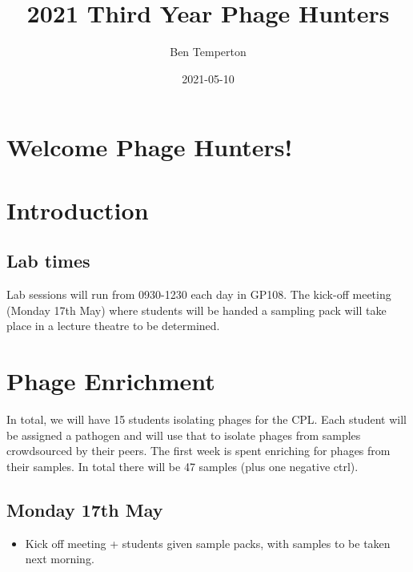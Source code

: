 \documentclass[
]{book}
\title{2021 Third Year Phage Hunters}
\author{Ben Temperton}
\date{2021-05-10}
\providecommand{\tightlist}{%
  \setlength{\itemsep}{0pt}\setlength{\parskip}{0pt}}
\begin{document}
\maketitle

{
\setcounter{tocdepth}{1}
\tableofcontents
}
\newpage

\hypertarget{welcome-phage-hunters}{%
\chapter*{Welcome Phage Hunters!}\label{welcome-phage-hunters}}

\hypertarget{introduction}{%
\chapter*{Introduction}\label{introduction}}

\hypertarget{lab-times}{%
\section*{Lab times}\label{lab-times}}

Lab sessions will run from 0930-1230 each day in GP108. The kick-off meeting (Monday 17th May) where students will be handed a sampling pack will take place in a lecture theatre to be determined.

\hypertarget{phage-enrichment}{%
\chapter{Phage Enrichment}\label{phage-enrichment}}

In total, we will have 15 students isolating phages for the CPL. Each student will be assigned a pathogen and will use that to isolate phages from samples crowdsourced by their peers. The first week is spent enriching for phages from their samples. In total there will be 47 samples (plus one negative ctrl).

\hypertarget{monday-17th-may}{%
\section{Monday 17th May}\label{monday-17th-may}}

\begin{itemize}
\tightlist
\item
  Kick off meeting + students given sample packs, with samples to be taken next morning.
\end{itemize}
\end{document}
